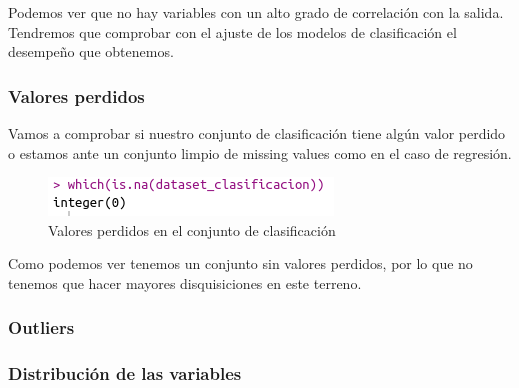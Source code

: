 \documentclass[12pt,a4paper]{article}
\begin{document}
Podemos ver que no hay variables con un alto grado de correlación con la salida. Tendremos que comprobar con el ajuste de los modelos de clasificación el desempeño que obtenemos.

\subsubsection{Valores perdidos}

Vamos a comprobar si nuestro conjunto de clasificación tiene algún valor perdido o estamos ante un conjunto limpio de missing values como en el caso de regresión.

\begin{figure}[H]
	\centering
	\includegraphics[scale=0.7]{./Imagenes/EDA/Clasificacion/valores_perdidos.png}
	\caption{Valores perdidos en el conjunto de clasificación}
\end{figure}

Como podemos ver tenemos un conjunto sin valores perdidos, por lo que no tenemos que hacer mayores disquisiciones en este terreno.

\subsubsection{Outliers}



\subsubsection{Distribución de las variables}
\end{document}
